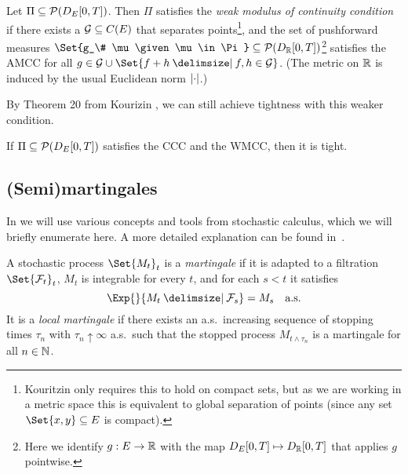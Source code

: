 \begin{definition}[WMCC]
  Let \( \Pi \subseteq \mathcal{P}(D_{E}[0,T]) \).
  Then \( \Pi \) satisfies the \textit{weak modulus of continuity condition} if there exists a \( \mathcal{G} \subseteq C(E) \) that separates points\footnote{Kouritzin only requires this to hold on compact sets, but as we are working in a metric space this is equivalent to global separation of points (since any set \( \Set{x,y} \subseteq E \) is compact).}, and the set of pushforward measures \( \Set{g_\# \mu \given \mu \in \Pi} \subseteq \cP(D_\bR[0,T]) \)\footnote{Here we identify \( g : E \to \mathbb{R} \) with the map \( D_E[0,T] \mapsto D_{\mathbb{R}}[0,T] \) that applies \( g \) pointwise.} satisfies the AMCC for all \( g \in \cG \cup \Set{f + h \given f, h \in \cG} \).
  (The metric on \( \mathbb{R} \) is induced by the usual Euclidean norm \( \lvert\cdot\rvert \).)
\end{definition}

By Theorem 20 from Kourizin \cite{kouritzinTightnessProbabilityMeasures2015}, we can still achieve tightness with this weaker condition.

\begin{theorem}
  If \( \Pi \subseteq \mathcal{P}(D_{E}[0,T]) \) satisfies the CCC and the WMCC, then it is tight.
\end{theorem}

\subsection{(Semi)martingales}

In  we will use various concepts and tools from stochastic calculus, which we will briefly enumerate here.
A more detailed explanation can be found in~\cite{klebanerIntroductionStochasticCalculus2012}.

\begin{definition}
  A stochastic process \(\Set{M_t}_{t}\) is a \textit{martingale} if it is adapted to a filtration \(\Set{\cF_t}_t\), \( M_t \) is integrable for every \(t\), and for each \( s < t \) it satisfies
  \begin{equation}
    \Exp{}{M_t \given \cF_s} = M_s \quad \text{a.s.}
  \end{equation}
  It is a \textit{local martingale} if there exists an a.s.\ increasing sequence of stopping times \( \tau_n \) with \( \tau_n \uparrow \infty \) a.s.\ such that the stopped process \( M_{t \land \tau_n} \) is a martingale for all \( n \in \mathbb{N} \). %
\end{definition}

